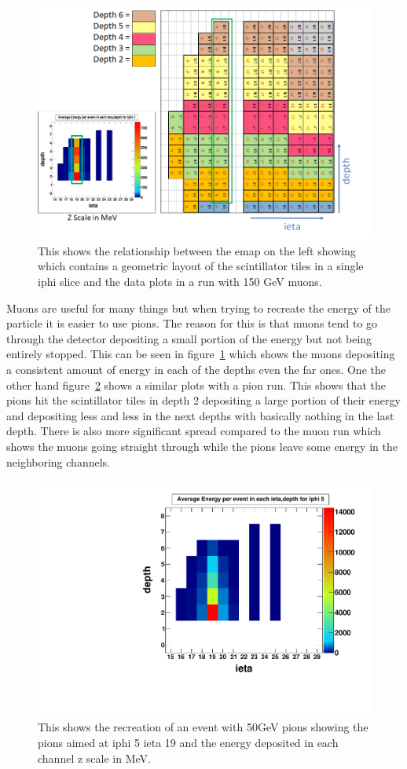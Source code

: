 \begin{figure}
\centering
\includegraphics[width=\linewidth]{Figures/eplot.png}
\caption{This shows the relationship between the emap on the left showing which contains a geometric layout of the scintillator tiles in a single iphi slice and the data plots in a run with 150 GeV muons.}
\label{fig:emap}
\end{figure}

Muons are useful for many things but when trying to recreate the energy of the particle it is easier to use pions. The reason for this is that muons tend to go through the detector depositing a small portion of the energy but not being entirely stopped. This can be seen in figure~\ref{fig:emap} which shows the muons depositing a consistent amount of energy in each of the depths even the far ones. One the other hand figure~\ref{fig:pionmap} shows a similar plots with a pion run. This shows that the pions hit the scintillator tiles in depth 2 depositing a large portion of their energy and depositing less and less in the next depths with basically nothing in the last depth. There is also more significant spread compared to the muon run which shows the muons going straight through while the pions leave some energy in the neighboring channels.

\begin{figure}
\centering
\includegraphics[width=0.7\linewidth]{Figures/pionrun.pdf}
\caption{This shows the recreation of an event with 50GeV pions showing the pions aimed at iphi 5 ieta 19 and the energy deposited in each channel z scale in MeV.}
\label{fig:pionmap}
\end{figure}

